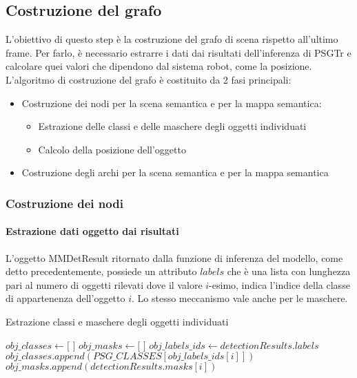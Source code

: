 \subsection{Costruzione del grafo}
L'obiettivo di questo step è la costruzione del grafo di scena rispetto all'ultimo frame. Per farlo, è necessario estrarre i dati dai risultati dell'inferenza di PSGTr e calcolare quei valori che dipendono dal sistema robot, come la posizione.
L'algoritmo di costruzione del grafo è costituito da 2 fasi principali:
\begin{itemize}
	\item Costruzione dei nodi per la scena semantica e per la mappa semantica:
	      \begin{itemize}
		      \item Estrazione delle classi e delle maschere degli oggetti individuati
		      \item Calcolo della posizione dell'oggetto
	      \end{itemize}
	\item Costruzione degli archi per la scena semantica e per la mappa semantica
\end{itemize}

\subsubsection{Costruzione dei nodi}
\paragraph{Estrazione dati oggetto dai risultati}
L'oggetto MMDetResult ritornato dalla funzione di inferenza del modello, come detto precedentemente, possiede un attributo $labels$ che è una lista con lunghezza pari al numero di oggetti rilevati dove il valore $i$-esimo, indica l'indice della classe di appartenenza dell'oggetto $i$. Lo stesso meccanismo vale anche per le maschere.

\begin{algorithm}
	\caption{Estrazione classi e maschere degli oggetti individuati}
	\begin{algorithmic}[1]
		\State $obj\_classes \gets \text{[ ]}$
		\State $obj\_masks \gets \text{[ ]}$
		\State $obj\_labels\_ids \gets detectionResults.labels$
		\State $obj\_classes.append(PSG\_CLASSES[obj\_labels\_ids[i]])$
		\State $obj\_masks.append(detectionResults.masks[i])$
		\EndFor
	\end{algorithmic}
\end{algorithm}


